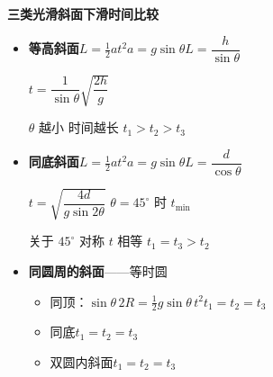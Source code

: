 \textbf{三类光滑斜面下滑时间比较}
\begin{itemize}
\item \textbf{等高斜面}\quad $L=\frac12at^2$\quad $a=g\sin\theta$\quad $L=\dfrac{h}{\sin\theta}$

$t=\dfrac{1}{\sin\theta}\sqrt{\dfrac{2h}{g}}$

$\theta$ 越小 时间越长
$t_1>t_2>t_3$
\item \textbf{同底斜面}\quad $L=\frac12at^2$\quad $a=g\sin\theta$\quad $L=\dfrac{d}{\cos\theta}$

$t=\sqrt{\dfrac{4d}{g\sin2\theta}}$
$\theta=45^\circ$ 时 $t_{\min}$

关于 $45^\circ$ 对称 $t$ 相等
$t_1=t_3>t_2$
\item \textbf{同圆周的斜面}——等时圆
\begin{itemize}
\item 同顶：$\sin\theta\,2R=\frac12g\sin\theta\,t^2$\quad $t_1=t_2=t_3$
\item 同底\quad $t_1=t_2=t_3$
\item 双圆内斜面\quad $t_1=t_2=t_3$
\end{itemize}
\end{itemize}
